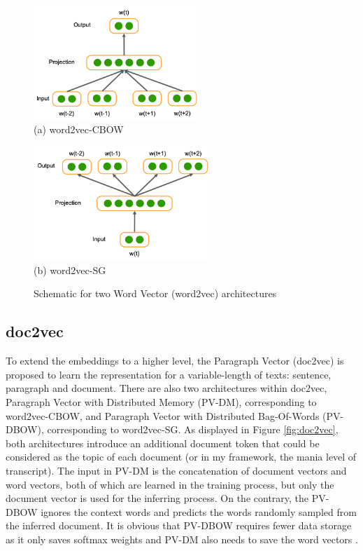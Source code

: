 \begin{figure}[ht]
    \centering
    \begin{minipage}{0.47\textwidth}
        \centering
        \includegraphics[height=4.3cm]{images/design/word2vec_cbow.png} \\
        (a) word2vec-CBOW
    \end{minipage}
    \begin{minipage}{0.48\textwidth}
        \centering
        \includegraphics[height=4.3cm]{images/design/word2vec_sg.png} \\
        (b) word2vec-SG
    \end{minipage}
    \caption{Schematic for two Word Vector (word2vec) architectures}
    \label{fig:word2vec}
\end{figure}

\subsection{doc2vec}

To extend the embeddings to a higher level, the Paragraph Vector (doc2vec) is proposed to learn the representation for a variable-length of texts: sentence, paragraph and document. There are also two architectures within doc2vec, Paragraph Vector with Distributed Memory (PV-DM), corresponding to word2vec-CBOW, and Paragraph Vector with Distributed Bag-Of-Words (PV-DBOW), corresponding to word2vec-SG. As displayed in Figure \ref{fig:doc2vec}, both architectures introduce an additional document token that could be considered as the topic of each document (or in my framework, the mania level of transcript). The input in PV-DM is the concatenation of document vectors and word vectors, both of which are learned in the training process, but only the document vector is used for the inferring process. On the contrary, the PV-DBOW ignores the context words and predicts the words randomly sampled from the inferred document. It is obvious that PV-DBOW requires fewer data storage as it only saves softmax weights and PV-DM also needs to save the word vectors \cite{mikolov2014}. 

